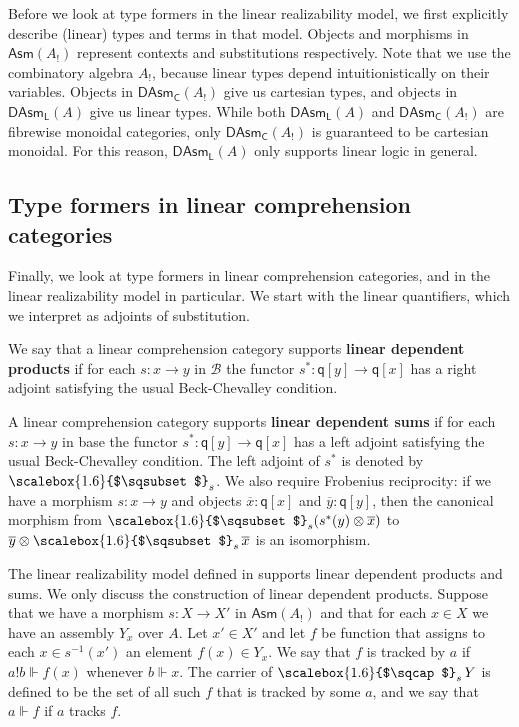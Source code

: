 \documentclass[a4paper,UKenglish,cleveref,numberwithinsect, autoref, thm-restate]{lipics-v2021}
\newcommand{\Base}{\mathcal{B}}
\newcommand{\subst}[1]{#1^*}
\newcommand{\fiber}[2]{#1[#2]}
\newcommand{\disp}[1]{\overline{#1}}
\newcommand{\xx}{\disp{x}}
\newcommand{\yy}{\disp{y}}
\newcommand{\fibM}{\mathsf{q}}
\newcommand{\LCA}{A}
\newcommand{\LCAtoPCA}[1]{#1_!}
\newcommand{\Asm}[1]{\mathsf{Asm}(#1)}
\newcommand{\DAsm}[1]{\mathsf{DAsm}_{\mathsf{C}}(#1)}
\newcommand{\LAsm}[1]{\mathsf{DAsm}_{\mathsf{L}}(#1)}
\newcommand{\realize}{\Vdash}
\newcommand{\tensor}{\otimes}
\newcommand{\Sqcap}{%
  \mathop{%
    \mathchoice
      {\scalebox{2.0}{$\sqcap$}}%
      {\scalebox{1.6}{$\sqcap$}}%
      {\scalebox{1.2}{$\sqcap$}}%
      {\scalebox{1.0}{$\sqcap$}}%
  }\displaylimits
}
\newcommand{\Sqsubset}{%
  \mathop{%
    \mathchoice
      {\scalebox{2.0}{$\sqsubset$}}%
      {\scalebox{1.6}{$\sqsubset$}}%
      {\scalebox{1.2}{$\sqsubset$}}%
      {\scalebox{1.0}{$\sqsubset$}}%
  }\displaylimits
}
\newcommand{\LSigSym}{\mathop{\Sqsubset}}
\newcommand{\LSig}[2]{\LSigSym_{#1} #2}
\newcommand{\LPiSym}{\mathop{\Sqcap}}
\newcommand{\LPi}[2]{\LPiSym_{#1} #2}
\newcommand{\expL}[1]{\mathbin{!} #1}
\begin{document}
Before we look at type formers in the linear realizability model,
we first explicitly describe (linear) types and terms in that model.
Objects and morphisms in $\Asm{\LCAtoPCA{\LCA}}$ 
represent contexts and substitutions respectively.
Note that we use the combinatory algebra $\LCAtoPCA{\LCA}$,
because linear types depend intuitionistically on their variables.
Objects in $\DAsm{\LCAtoPCA{\LCA}}$ give us cartesian types,
and objects in $\LAsm{\LCA}$ give us linear types.
While both $\LAsm{\LCA}$ and $\DAsm{\LCAtoPCA{\LCA}}$ are fibrewise monoidal categories,
only $\DAsm{\LCAtoPCA{\LCA}}$ is guaranteed to be cartesian monoidal.
For this reason, $\LAsm{\LCA}$ only supports linear logic in general.

\subsection{Type formers in linear comprehension categories}
Finally,
we look at type formers in linear comprehension categories,
and in the linear realizability model in particular.
We start with the linear quantifiers,
which we interpret as adjoints of substitution.

\begin{definition}
We say that a linear comprehension category supports \textbf{linear dependent products} if for each $s : x \rightarrow y$ in $\Base$
the functor $\subst{s} : \fiber{\fibM}{y} \rightarrow \fiber{\fibM}{x}$
has a right adjoint satisfying the usual Beck-Chevalley condition.

A linear comprehension category supports \textbf{linear dependent sums}  if for each $s : x \rightarrow y$ in base
the functor $\subst{s} : \fiber{\fibM}{y} \rightarrow \fiber{\fibM}{x}$
has a left adjoint satisfying the usual Beck-Chevalley condition.
The left adjoint of $\subst{s}$ is denoted by $\LSigSym_{s}$.
We also require Frobenius reciprocity:
if we have a morphism $s : x \rightarrow y$
and objects $\xx : \fiber{\fibM}{x}$ and $\yy : \fiber{\fibM}{y}$,
then the canonical morphism
from $\LSig{s}{(\subst{s}(y) \tensor \xx)}$
to $\yy \tensor \LSig{s}{\xx}$
is an isomorphism.
\end{definition}

\begin{example}
\label{exa:linear-realizability-types}
The linear realizability model defined in  supports linear dependent products and sums.
We only discuss the construction of linear dependent products.
Suppose that we have a morphism $s : X \rightarrow X'$ in $\Asm{\LCAtoPCA{\LCA}}$
and that for each $x \in X$
we have an assembly $Y_x$ over $\LCA$.
Let $x' \in X'$
and let $f$ be function that assigns to each $x \in s^{-1}(x')$
an element $f(x) \in Y_x$.
We say that $f$ is tracked by $a$
if $a {\expL{b}} \realize f(x)$
whenever $b \realize x$.
The carrier of $\LPi{s}{Y}$
is defined to be the set of all such $f$ that is tracked by some $a$,
and we say that $a \realize f$ if $a$ tracks $f$.
\end{example}
\end{document}
